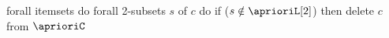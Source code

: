forall itemsets do
	forall 2-subsets $s$ of $c$ do
		if ($s \notin \aprioriL[2]$) then
			delete $c$ from $\aprioriC$